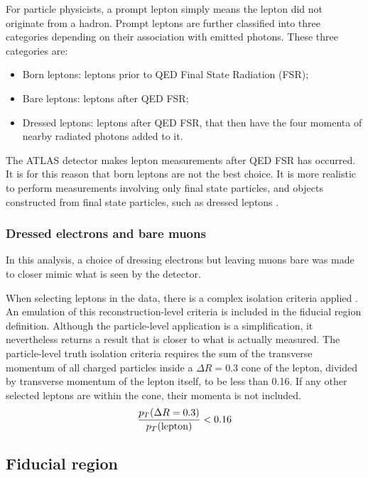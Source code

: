 For particle physicists, a prompt lepton simply means the lepton did not originate from a hadron. Prompt leptons are further classified into three categories depending on their association with emitted photons. These three categories are:
\begin{itemize}
    \item Born leptons: leptons prior to QED Final State Radiation (FSR);
    \item Bare leptons: leptons after QED FSR;
    \item Dressed leptons: leptons after QED FSR, that then have the four momenta of nearby radiated photons added to it. 
\end{itemize}
The ATLAS detector makes lepton measurements after QED FSR has occurred. It is for this reason that born leptons are not the best choice. It is more realistic to perform measurements involving only final state particles, and objects constructed from final state particles, such as dressed leptons \cite{Kar:ab1be6}. 

\subsubsection{Dressed electrons and bare muons}

In this analysis, a choice of dressing electrons but leaving muons bare was made to closer mimic what is seen by the detector. 

When selecting leptons in the data, there is a complex isolation criteria applied . An emulation of this reconstruction-level criteria is included in the fiducial region definition. Although the particle-level application is a simplification, it nevertheless returns a result that is closer to what is actually measured. The particle-level truth isolation criteria requires the sum of the transverse momentum of all charged particles inside a $\Delta R  = 0.3$ cone of the lepton, divided by transverse momentum of the lepton itself, to be less than 0.16. If any other selected leptons are within the cone, their
momenta is not included. 
$$\dfrac{p_{T}(\Delta R  = 0.3)}{p_{T}(\text{lepton})}<0.16$$
\subsection{Fiducial region}

